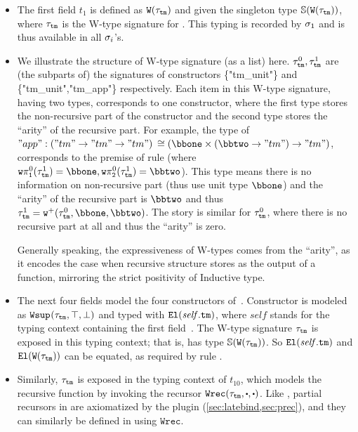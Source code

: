\begin{itemize}
  [labelsep=*,leftmargin=1pc,itemsep=3pt]

\item 
The first field $t_1$ is defined as $\texttt{W}({\tau_{\texttt{tm}}})$
and given the singleton type $\mathbb{S}({\texttt{W}({\tau_{\texttt{tm}}})})$, where $\tau_{\texttt{tm}}$
is the W-type signature for .
This typing is recorded by $\sigma_1$ and is thus available in all $\sigma_i$'s.

\item We illustrate the structure of W-type signature (as a list) here. $\tau_{\texttt{tm}}^0, \tau_{\texttt{tm}}^1$ are (the subparts of) the signatures of constructors \{"tm\_unit"\} and \{"tm\_unit","tm\_app"\} respectively. Each item in this W-type signature, having two types, corresponds to one constructor, where the first type stores the non-recursive part of the constructor and the second type stores the ``arity'' of the  recursive part. For example, the type of $"app" : ("tm" \to "tm" \to "tm")$ $\cong (\bbone \times (\bbtwo \to "tm") \to "tm")$, corresponds to the premise of rule  (where $\wsigproj{0}{1}{\wsig_{\texttt{tm}}^1} = \bbone, \wsigproj{0}{2}{\wsig_{\texttt{tm}}^1} = \bbtwo$). This type means there is no information on non-recursive part (thus use unit type $\bbone$) and the ``arity'' of the recursive part is $\bbtwo$ and thus $\wsig_{\texttt{tm}}^1 = \WSigAdd{\wsig_{\texttt{tm}}^0}{\bbone}{\bbtwo}$.  The story is similar for $\tau_{\texttt{tm}}^0$, where there is no recursive part at all and thus the ``arity'' is zero.

Generally speaking, the expressiveness of W-types comes from the ``arity'', as it encodes the case when recursive structure stores as the output of a function, mirroring the strict positivity of Inductive type.
\item 
The next four fields model the four constructors of~.
Constructor  is modeled as $\texttt{Wsup}_{}({\tau_{\texttt{tm}}},{\top},{\bot})$
and typed with $\texttt{El}({\mathit{self}.\texttt{tm}})$, where $\mathit{self}$ stands for
the typing context containing the first field~.
The W-type signature $\tau_{\texttt{tm}}$ is exposed in
this typing context; that is,  has type $\mathbb{S}({\texttt{W}({\tau_{\texttt{tm}}})})$.
So $\texttt{El}({\mathit{self}.\texttt{tm}})$ and $\texttt{El}({\texttt{W}({\tau_{\texttt{tm}}})})$ can be equated,
as required by rule .

\item
Similarly, $\tau_{\texttt{tm}}$ is exposed in the typing context of
$t_{10}$, which models the recursive function  by invoking
the recursor $\Wrec{\wsig_{\texttt{tm}}}{\cDot}{\cDot}$.
%
Like , partial recursors in \Lang are axiomatized by the plugin
(\cref{sec:latebind,sec:prec}), and they can similarly be defined in \TT
using $\texttt{Wrec}$.


\end{itemize}

